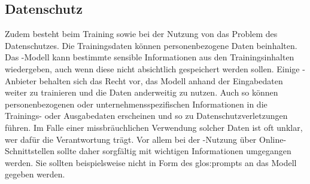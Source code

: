 \documentclass[../main.tex]{subfiles}
\begin{document}
\subsection{Datenschutz}
\label{sec:datenschutz}

Zudem besteht beim Training sowie bei der Nutzung von  das Problem des Datenschutzes. Die Trainingsdaten können personenbezogene Daten beinhalten. Das -Modell kann bestimmte sensible 
Informationen aus den Trainingsinhalten wiedergeben, auch wenn diese nicht absichtlich gespeichert werden sollen. Einige -Anbieter behalten sich das Recht vor, das Modell anhand der 
Eingabedaten weiter zu trainieren und die Daten anderweitig zu nutzen. Auch so können personenbezogenen oder unternehmensspezifischen Informationen in die Trainings- oder Ausgabedaten 
erscheinen und so zu Datenschutzverletzungen führen. Im Falle einer missbräuchlichen Verwendung solcher Daten ist oft unklar, wer dafür die Verantwortung trägt. Vor allem bei der -Nutzung 
über Online-Schnittstellen sollte daher sorgfältig mit wichtigen Informationen umgegangen werden. Sie sollten beispielsweise nicht in Form des \gls{glos:prompt}s an das Modell gegeben werden.
\end{document}
